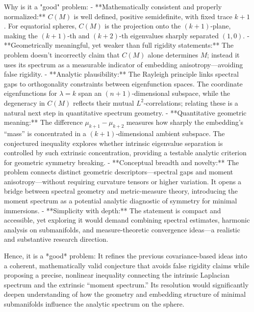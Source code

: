 Why is it a "good" problem:  
- **Mathematically consistent and properly normalized:** \(C(M)\) is well defined, positive semidefinite, with fixed trace \(k+1\). For equatorial spheres, \(C(M)\) is the projection onto the \((k+1)\)-plane, making the \((k+1)\)-th and \((k+2)\)-th eigenvalues sharply separated \((1,0)\).  
- **Geometrically meaningful, yet weaker than full rigidity statements:** The problem doesn’t incorrectly claim that \(C(M)\) alone determines \(M\); instead it uses its spectrum as a measurable indicator of embedding anisotropy—avoiding false rigidity.  
- **Analytic plausibility:** The Rayleigh principle links spectral gaps to orthogonality constraints between eigenfunction spaces. The coordinate eigenfunctions for \(\lambda=k\) span an \((n+1)\)-dimensional subspace, while the degeneracy in \(C(M)\) reflects their mutual \(L^2\)-correlations; relating these is a natural next step in quantitative spectrum geometry.  
- **Quantitative geometric meaning:** The difference \(\mu_{k+1}-\mu_{k+2}\) measures how sharply the embedding’s “mass” is concentrated in a \((k+1)\)-dimensional ambient subspace. The conjectured inequality explores whether intrinsic eigenvalue separation is controlled by such extrinsic concentration, providing a testable analytic criterion for geometric symmetry breaking.  
- **Conceptual breadth and novelty:** The problem connects distinct geometric descriptors—spectral gaps and moment anisotropy—without requiring curvature tensors or higher variation. It opens a bridge between spectral geometry and metric-measure theory, introducing the moment spectrum as a potential analytic diagnostic of symmetry for minimal immersions.  
- **Simplicity with depth:** The statement is compact and accessible, yet exploring it would demand combining spectral estimates, harmonic analysis on submanifolds, and measure-theoretic convergence ideas—a realistic and substantive research direction.

Hence, it is a *good* problem:  
It refines the previous covariance-based ideas into a coherent, mathematically valid conjecture that avoids false rigidity claims while proposing a precise, nonlinear inequality connecting the intrinsic Laplacian spectrum and the extrinsic “moment spectrum.”  
Its resolution would significantly deepen understanding of how the geometry and embedding structure of minimal submanifolds influence the analytic spectrum on the sphere.